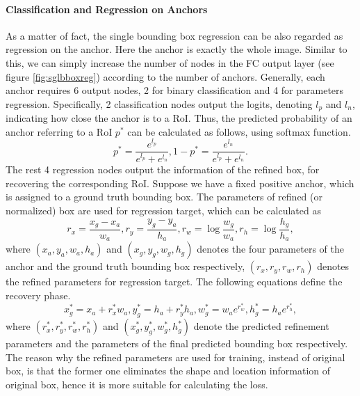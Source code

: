\paragraph{Classification and Regression on Anchors}
As a matter of fact, the single bounding box regression can be also regarded as regression on the anchor. Here the anchor is exactly the whole image. Similar to this, we can simply increase the number of nodes in the FC output layer (see figure \ref{fig:sglbboxreg}) according to the number of anchors. Generally, each anchor requires 6 output nodes, 2 for binary classification and 4 for parameters regression. Specifically, 2 classification nodes output the logits, denoting $l_p$ and $l_n$, indicating how close the anchor is to a RoI. Thus, the predicted probability of an anchor referring to a RoI $p^*$ can be calculated as follows, using softmax function.
\begin{equation}
	p^* = \frac{e^{l_p}}{e^{l_p} + e^{l_n}}, 1 - p^* = \frac{e^{l_n}}{e^{l_p} + e^{l_n}}.
\end{equation}
The rest 4 regression nodes output the information of the refined box, for recovering the corresponding RoI. Suppose we have a fixed positive anchor, which is assigned to a ground truth bounding box. The parameters of refined (or normalized) box are used for regression target, which can be calculated as
\begin{equation}
	r_x = \frac{x_g - x_a}{w_a}, r_y = \frac{y_g - y_a}{h_a}, r_w = \log\frac{w_g}{w_a}, r_h = \log\frac{h_g}{h_a},
\end{equation}
where $(x_a, y_a, w_a, h_a)$ and $(x_g, y_g, w_g, h_g)$ denotes the four parameters of the anchor and the ground truth bounding box respectively, $(r_x, r_y, r_w, r_h)$ denotes the refined parameters for regression target. The following equations define the recovery phase.
\begin{equation}
	x_g^* = x_a + r_x^*w_a, y_g^* = h_a + r_y^*h_a, w_g^* = w_ae^{r_w^*}, h_g^* = h_ae^{r_h^*},
\end{equation}
where $(r_x^*, r_y^*, r_w^*, r_h^*)$ and $(x_g^*, y_g^*, w_g^*, h_g^*)$ denote the predicted refinement parameters and the parameters of the final predicted bounding box respectively. The reason why the refined parameters are used for training, instead of original box, is that the former one eliminates the shape and location information of original box, hence it is more suitable for calculating the loss.



